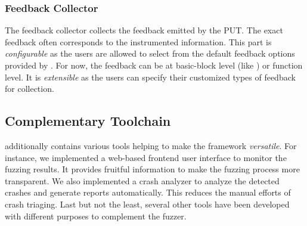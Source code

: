 \subsubsection{Feedback Collector}
The feedback collector collects the feedback emitted by the PUT.
The exact feedback often corresponds to the instrumented information.
This part is \textit{configurable} as the users are allowed to select from the default feedback options provided by {\FOT}.
For now, the feedback can be at basic-block level (like {\AFL}) or function level.
It is \textit{extensible} as the users can specify their customized types of feedback for collection.

\subsection{Complementary Toolchain}
{\FOT} additionally contains various tools helping to make the framework \textit{versatile}.
For instance, we implemented a web-based frontend user interface to monitor the fuzzing results.
It provides fruitful information to make the fuzzing process more transparent.
We also implemented a crash analyzer to analyze the detected crashes and generate reports automatically.
This reduces the manual efforts of crash triaging.
Last but not the least, several other tools have been developed with different purposes to complement the fuzzer.


















